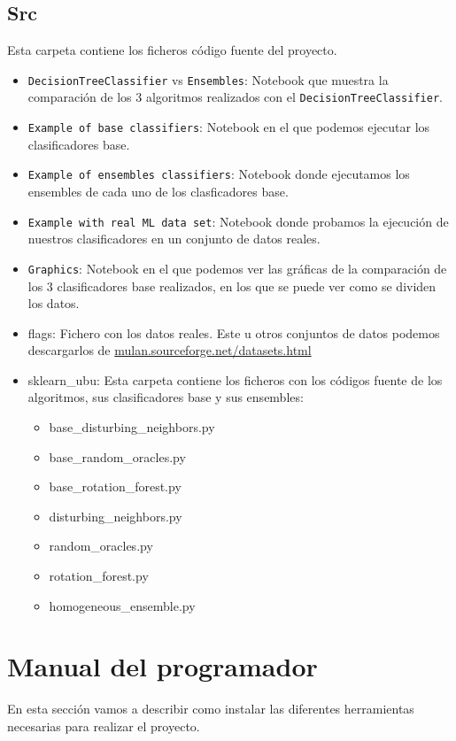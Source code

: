 \subsection{Src}
Esta carpeta contiene los ficheros código fuente del proyecto.
\begin{itemize}
	\item \texttt{DecisionTreeClassifier}  vs \texttt{Ensembles}: Notebook que muestra la comparación de los 3 algoritmos realizados con el \texttt{DecisionTreeClassifier}.
	\item \texttt{Example of base classifiers}: Notebook en el que podemos ejecutar los clasificadores base.
	\item \texttt{Example of ensembles classifiers}: Notebook donde ejecutamos los ensembles de cada uno de los clasficadores base.
	\item \texttt{Example with real ML data set}: Notebook donde probamos la ejecución de nuestros clasificadores en un conjunto de datos reales.
	\item \texttt{Graphics}: Notebook en el que podemos ver las gráficas de la comparación de los 3 clasificadores base realizados, en los que se puede ver como se dividen los datos.
	\item flags: Fichero con los datos reales. Este u otros conjuntos de datos podemos descargarlos de \url{mulan.sourceforge.net/datasets.html}
	\item sklearn\_ubu: Esta carpeta contiene los ficheros  con los códigos fuente de los algoritmos, sus clasificadores base y sus ensembles:
	\begin{itemize}
		\item base\_disturbing\_neighbors.py
		\item base\_random\_oracles.py
		\item base\_rotation\_forest.py
		\item disturbing\_neighbors.py
		\item random\_oracles.py
		\item rotation\_forest.py
		\item homogeneous\_ensemble.py
	\end{itemize}
\end{itemize}

\section{Manual del programador}
En esta sección vamos a describir como instalar las diferentes herramientas necesarias para realizar el proyecto.

